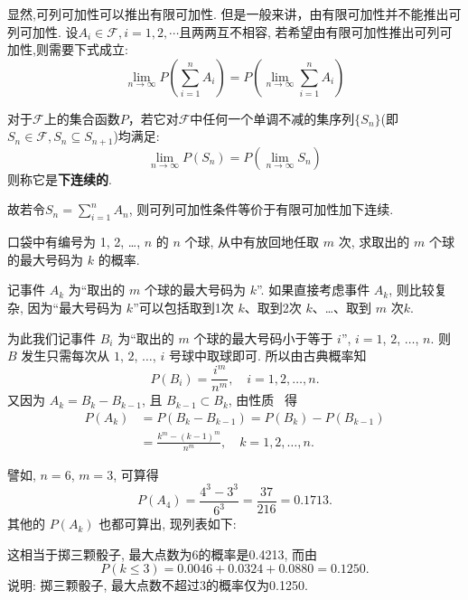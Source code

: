 显然,可列可加性可以推出有限可加性. 但是一般来讲，由有限可加性并不能推出可列可加性. 设$A_i \in \mathscr{F}, i=1,2,\cdots $且两两互不相容, 若希望由有限可加性推出可列可加性,则需要下式成立:
\[ \lim_{n \to \infty}P(\sum_{i=1}^n A_i) =P(\lim_{n \to \infty}\sum_{i=1}^{n} A_i) \]

\begin{definition}
    对于$\mathscr{F}$上的集合函数$P$，若它对$\mathscr{F}$中任何一个单调不减的集序列$\{ S_n \}$(即$ S_n \in \mathscr{F}, S_n \subseteq  S_{n+1} $)均满足:
    \[ \lim_{n \to \infty}P(S_n) =P(\lim_{n \to \infty} S_n) \]
    则称它是\textbf{下连续的}.
\end{definition}

故若令$S_n = \sum_{i=1}^n A_n$, 则可列可加性条件等价于有限可加性加下连续.

\begin{example}
    口袋中有编号为 1, 2, \dots, $n$ 的 $n$ 个球,
    从中有放回地任取 $m$ 次,
    求取出的 $m$ 个球的最大号码为 $k$ 的概率.
\end{example}

\begin{solution}
    记事件 $A_k$ 为“取出的 $m$ 个球的最大号码为 $k$”.
    如果直接考虑事件 $A_k$,
    则比较复杂,
    因为“最大号码为 $k$”可以包括取到1次 $k$、取到2次 $k$、\dots、取到 $m$ 次$k$.

    为此我们记事件 $B_i$ 为“取出的 $m$ 个球的最大号码小于等于 $i$”, $i=1$, $2$, $\dotsc$, $n$.
    则 $B$ 发生只需每次从 $1$, $2$, $\dotsc$, $i$ 号球中取球即可.
    所以由古典概率知
    \[
        P(B_i) = \frac{i^m}{n^m}, \quad i = 1, 2, \dotsc, n.
    \]
    又因为 $A_k = B_k - B_{k-1}$,
    且 $B_{k-1} \subset B_k$,
    由性质~\label{property1.3.4} 得
    \begin{align*}
        P(A_k) & = P(B_k - B_{k-1}) = P(B_k) - P(B_{k-1})                 \\
               & = \frac{k^m - (k - 1)^m}{n^m}, \quad k = 1,2, \dotsc, n.
    \end{align*}

    譬如,
    $n = 6$, $m = 3$,
    可算得
    \[
        P(A_4) = \frac{4^3 - 3^3}{6^3} = \frac{37}{216} = 0.1713.
    \]
    其他的 $P(A_k)$ 也都可算出,
    现列表如下:



    这相当于掷三颗骰子,
    最大点数为6的概率是0.4213,
    而由
    \[
        P(k \le 3) = 0.0046 + 0.0324 + 0.0880 = 0.1250.
    \]
    说明:
    掷三颗骰子,
    最大点数不超过3的概率仅为0.1250.
\end{solution}


